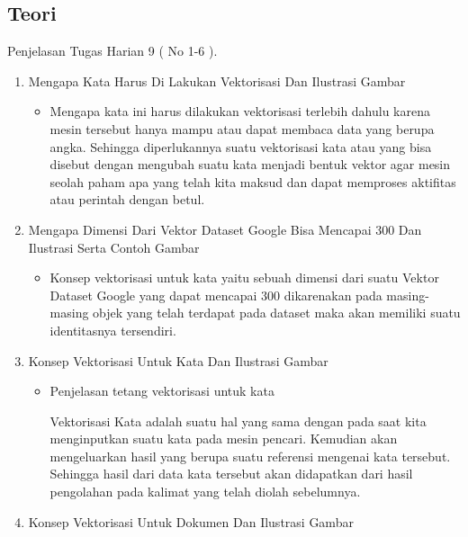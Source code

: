 \subsection{Teori}
Penjelasan Tugas Harian 9 ( No 1-6 ). 
\begin{enumerate}
\item Mengapa Kata Harus Di Lakukan Vektorisasi Dan Ilustrasi Gambar
\begin{itemize}
\item Mengapa kata ini harus dilakukan vektorisasi terlebih dahulu karena mesin tersebut hanya mampu atau dapat  membaca data yang berupa angka. Sehingga diperlukannya suatu  vektorisasi kata atau yang bisa disebut dengan mengubah suatu kata menjadi bentuk vektor agar mesin seolah paham apa yang telah kita maksud dan dapat memproses aktifitas atau perintah dengan betul.
\par
\end{itemize}
\par
\par
\item Mengapa Dimensi Dari Vektor Dataset Google Bisa Mencapai 300 Dan Ilustrasi Serta Contoh Gambar
\begin{itemize}
\item Konsep vektorisasi untuk kata yaitu sebuah dimensi dari suatu Vektor Dataset Google yang dapat mencapai 300  dikarenakan pada masing-masing objek yang telah terdapat pada dataset maka akan memiliki suatu identitasnya tersendiri.
\par
\end{itemize}
\par
\par
\item Konsep Vektorisasi Untuk Kata Dan Ilustrasi Gambar
\begin{itemize}
\item Penjelasan tetang vektorisasi untuk kata
\par Vektorisasi Kata adalah suatu hal yang sama dengan pada saat  kita menginputkan suatu kata pada mesin pencari. Kemudian akan  mengeluarkan hasil yang berupa suatu referensi mengenai kata tersebut. Sehingga hasil dari data kata tersebut akan didapatkan dari hasil pengolahan pada kalimat yang telah diolah sebelumnya.
\end{itemize}
\par
\par
\item Konsep Vektorisasi Untuk Dokumen Dan Ilustrasi Gambar
\begin{itemize}

\end{itemize}
\end{enumerate}
